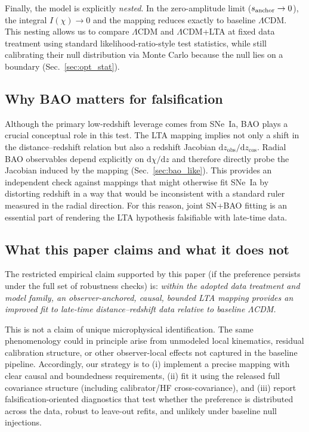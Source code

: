 \documentclass[10pt]{article}
\newcommand{\zobs}{z_{\mathrm{obs}}}
\newcommand{\zcos}{z_{\mathrm{cos}}}
\providecommand{\dd}{\mathrm{d}}
\begin{document}
Finally, the model is explicitly \emph{nested}.
In the zero-amplitude limit ($s_{\rm anchor}\to 0$), the integral $I(\chi)\to 0$ and the mapping
reduces exactly to baseline $\Lambda$CDM.
This nesting allows us to compare $\Lambda$CDM and $\Lambda$CDM+LTA at fixed data treatment using
standard likelihood-ratio-style test statistics, while still calibrating their null distribution
via Monte Carlo because the null lies on a boundary (Sec.~\ref{sec:opt_stat}).

\subsection{Why BAO matters for falsification}

Although the primary low-redshift leverage comes from SNe~Ia, BAO plays a crucial conceptual role in
this test.
The LTA mapping implies not only a shift in the distance--redshift relation but also a redshift
Jacobian $\dd \zobs/\dd \zcos$.
Radial BAO observables depend explicitly on $\dd \chi/\dd z$ and therefore directly probe the
Jacobian induced by the mapping (Sec.~\ref{sec:bao_like}).
This provides an independent check against mappings that might otherwise fit SNe~Ia by distorting
redshift in a way that would be inconsistent with a standard ruler measured in the radial direction.
For this reason, joint SN+BAO fitting is an essential part of rendering the LTA hypothesis
falsifiable with late-time data.

\subsection{What this paper claims and what it does not}

The restricted empirical claim supported by this paper (if the preference persists under the full
set of robustness checks) is:
\emph{within the adopted data treatment and model family, an observer-anchored, causal, bounded LTA
mapping provides an improved fit to late-time distance--redshift data relative to baseline
$\Lambda$CDM.}

This is not a claim of unique microphysical identification.
The same phenomenology could in principle arise from unmodeled local kinematics, residual
calibration structure, or other observer-local effects not captured in the baseline pipeline.
Accordingly, our strategy is to (i) implement a precise mapping with clear causal and boundedness
requirements, (ii) fit it using the released full covariance structure (including calibrator/HF
cross-covariance), and (iii) report falsification-oriented diagnostics that test whether the
preference is distributed across the data, robust to leave-out refits, and unlikely under baseline
null injections.
\end{document}
